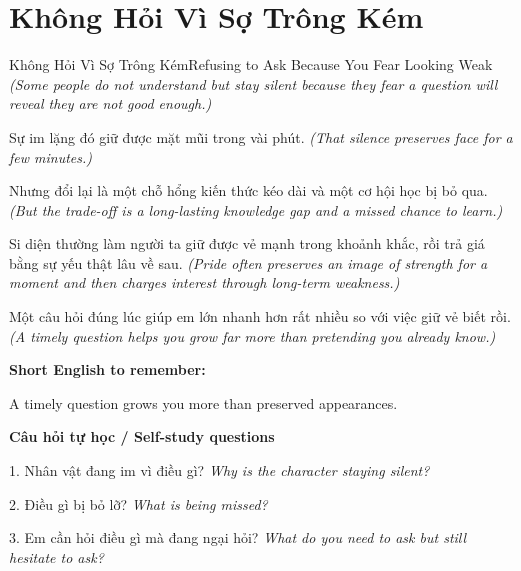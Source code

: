 \section{Không Hỏi Vì Sợ Trông Kém}
\begin{truyen}{Không Hỏi Vì Sợ Trông Kém}{Refusing to Ask Because You Fear Looking Weak}
\textit{(Some people do not understand but stay silent because they fear a question will reveal they are not good enough.)}

Sự im lặng đó giữ được mặt mũi trong vài phút.
\textit{(That silence preserves face for a few minutes.)}

Nhưng đổi lại là một chỗ hổng kiến thức kéo dài và một cơ hội học bị bỏ qua.
\textit{(But the trade-off is a long-lasting knowledge gap and a missed chance to learn.)}

Si diện thường làm người ta giữ được vẻ mạnh trong khoảnh khắc, rồi trả giá bằng sự yếu thật lâu về sau.
\textit{(Pride often preserves an image of strength for a moment and then charges interest through long-term weakness.)}

\end{truyen}

\begin{baihoc}
Một câu hỏi đúng lúc giúp em lớn nhanh hơn rất nhiều so với việc giữ vẻ biết rồi.
\textit{(A timely question helps you grow far more than pretending you already know.)}
\end{baihoc}

\begin{ghinhoanh}
\textbf{Short English to remember:}

A timely question grows you more than preserved appearances.

\end{ghinhoanh}

\begin{tuhocnhanh}
\textbf{Câu hỏi tự học / Self-study questions}

1. Nhân vật đang im vì điều gì? \textit{Why is the character staying silent?}

2. Điều gì bị bỏ lỡ? \textit{What is being missed?}

3. Em cần hỏi điều gì mà đang ngại hỏi? \textit{What do you need to ask but still hesitate to ask?}
\end{tuhocnhanh}
\ngancach

